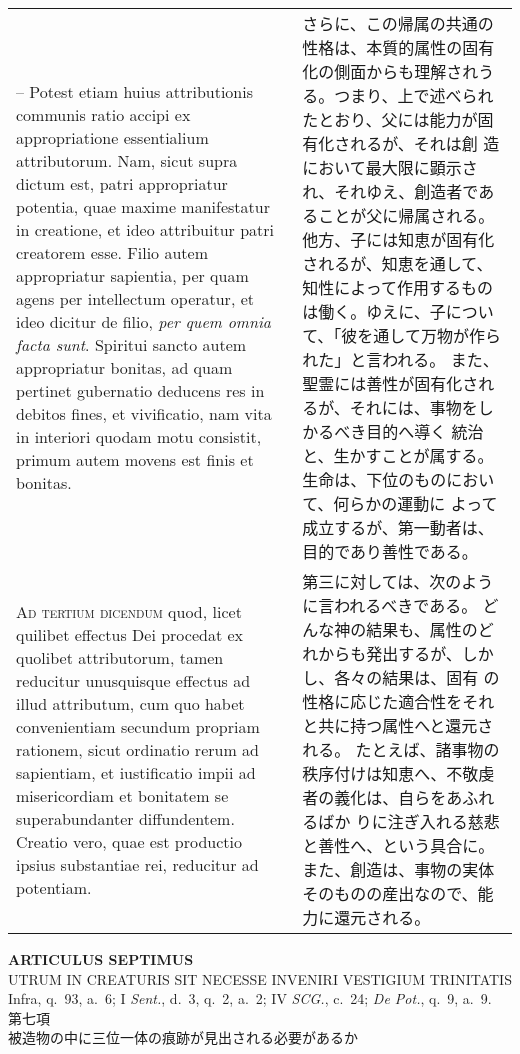 \documentclass[10pt]{jsarticle} %
\begin{document}
\begin{longtable}{p{21em}p{21em}}
\\



-- Potest etiam huius attributionis communis
ratio accipi ex appropriatione essentialium attributorum. Nam, sicut
supra dictum est, patri appropriatur potentia, quae maxime manifestatur
in creatione, et ideo attribuitur patri creatorem esse. Filio autem
appropriatur sapientia, per quam agens per intellectum operatur, et ideo
dicitur de filio, {\itshape per quem omnia facta sunt}. Spiritui sancto autem
appropriatur bonitas, ad quam pertinet gubernatio deducens res in
debitos fines, et vivificatio, nam vita in interiori quodam motu
consistit, primum autem movens est finis et bonitas.

&

さらに、この帰属の共通の性格は、本質的属性の固有化の側面からも理解されう
 る。つまり、上で述べられたとおり、父には能力が固有化されるが、それは創
 造において最大限に顕示され、それゆえ、創造者であることが父に帰属される。
他方、子には知恵が固有化されるが、知恵を通して、知性によって作用するもの
 は働く。ゆえに、子について、「彼を通して万物が作られた」と言われる。
また、聖霊には善性が固有化されるが、それには、事物をしかるべき目的へ導く
 統治と、生かすことが属する。生命は、下位のものにおいて、何らかの運動に
 よって成立するが、第一動者は、目的であり善性である。

\\


{\scshape Ad tertium dicendum} quod, licet quilibet
effectus Dei procedat ex quolibet attributorum, tamen reducitur
unusquisque effectus ad illud attributum, cum quo habet convenientiam
secundum propriam rationem, sicut ordinatio rerum ad sapientiam, et
iustificatio impii ad misericordiam et bonitatem se superabundanter
diffundentem. Creatio vero, quae est productio ipsius substantiae rei,
reducitur ad potentiam.


&

第三に対しては、次のように言われるべきである。
どんな神の結果も、属性のどれからも発出するが、しかし、各々の結果は、固有
 の性格に応じた適合性をそれと共に持つ属性へと還元される。
たとえば、諸事物の秩序付けは知恵へ、不敬虔者の義化は、自らをあふれるばか
 りに注ぎ入れる慈悲と善性へ、という具合に。
また、創造は、事物の実体そのものの産出なので、能力に還元される。

\end{longtable}
\newpage
{}

\begin{center}
 {\Large {\bf ARTICULUS SEPTIMUS}}\\
 {\large UTRUM IN CREATURIS SIT NECESSE INVENIRI VESTIGIUM TRINITATIS}\\
 {\footnotesize Infra, q.~93, a.~6; I {\itshape Sent.}, d.~3, q.~2,
 a.~2; IV {\itshape SCG.}, c.~24; {\itshape De Pot.}, q.~9, a.~9.}\\
 {\Large 第七項\\被造物の中に三位一体の痕跡が見出される必要があるか}
\end{center}
\end{document}
